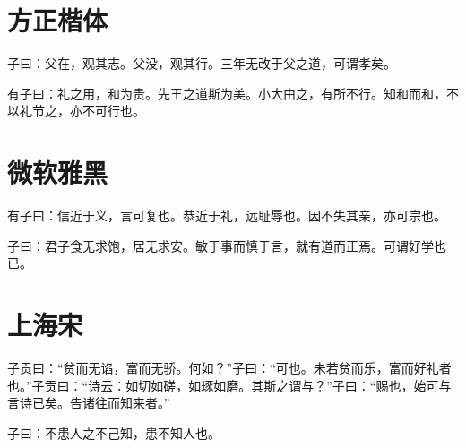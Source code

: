 \documentclass[10pt,letterpaper,twoside]{article}
\begin{document}
\section{方正楷体}

    子曰：父在，观其志。父没，观其行。三年无改于父之道，可谓孝矣。

    有子曰：礼之用，和为贵。先王之道斯为美。小大由之，有所不行。知和而和，不以礼节之，亦不可行也。

\section{微软雅黑}

    有子曰：信近于义，言可复也。恭近于礼，远耻辱也。因不失其亲，亦可宗也。

    子曰：君子食无求饱，居无求安。敏于事而慎于言，就有道而正焉。可谓好学也已。

\section{上海宋}

    子贡曰：“贫而无谄，富而无骄。何如？”子曰：“可也。未若贫而乐，富而好礼者也。”子贡曰：“诗云：如切如磋，如琢如磨。其斯之谓与？”子曰：“赐也，始可与言诗已矣。告诸往而知来者。”

    子曰：不患人之不己知，患不知人也。
\end{document}
